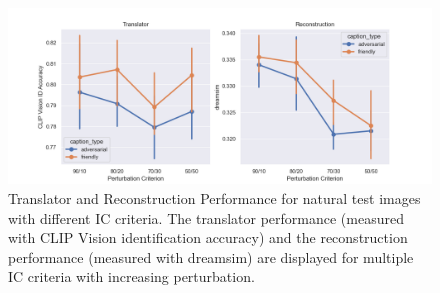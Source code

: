 \begin{figure}[ht]
    \centering
    \includegraphics[width=1\textwidth]{plots/advpert_discussion_explore_pert_ratio_test_translator_and_recon.png}
    \caption[Translator/Reconstruction Performance for natural test images with different IC criteria]{Translator and Reconstruction Performance for natural test images with different IC criteria. The translator performance (measured with CLIP Vision identification accuracy) and the reconstruction performance (measured with dreamsim) are displayed for multiple IC criteria with increasing perturbation.}\label{fig:advpert_discussion_explore_pert_ratio_test_translator_and_recon}
\end{figure}

